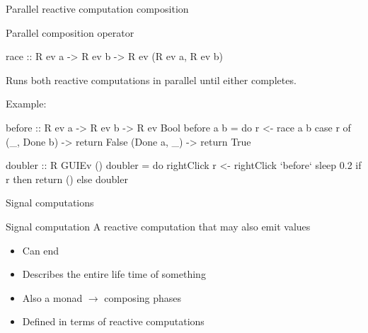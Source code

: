 \documentclass{beamer}
\begin{document}
\begin{frame}{Parallel reactive computation composition}
\begin{block}{Parallel composition operator}
\begin{code}
race :: R ev a -> R ev b -> R ev (R ev a, R ev b)
\end{code}
Runs both reactive computations in parallel until either
completes.
\end{block}

Example: 
\begin{code}
before :: R ev a -> R ev b -> R ev Bool
before a b = do  r <- race a b
                 case r of
                   (_, Done b) -> return False
                   (Done a, _) -> return True

doubler :: R GUIEv ()
doubler = do  rightClick
              r <- rightClick `before` sleep 0.2
              if r then return () else doubler
\end{code}
\end{frame}
\begin{frame}{Signal computations}
\begin{block}{Signal computation}
A reactive computation that may also \alert{emit} values
\begin{itemize}
\item Can \alert{end}
\item Describes the entire life time of something
\item Also a monad $\rightarrow$ composing phases
\item Defined in terms of reactive computations
\end{itemize}

\end{block}
\pause
{}
\end{frame}
\end{document}
